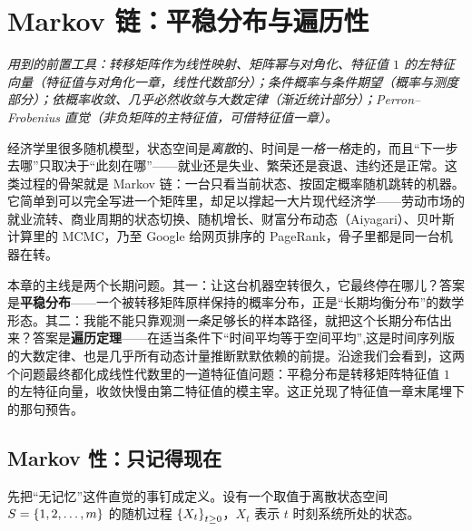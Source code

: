 \chapter{Markov 链：平稳分布与遍历性}
\label{ch:markov}

\noindent\emph{用到的前置工具：转移矩阵作为线性映射、矩阵幂与对角化、特征值 $1$ 的左特征向量（特征值与对角化一章，线性代数部分）；条件概率与条件期望（概率与测度部分）；依概率收敛、几乎必然收敛与大数定律（渐近统计部分）；Perron--Frobenius 直觉（非负矩阵的主特征值，可借特征值一章）。}
\medskip

经济学里很多随机模型，状态空间是\emph{离散}的、时间是\emph{一格一格}走的，而且``下一步去哪''只取决于``此刻在哪''——就业还是失业、繁荣还是衰退、违约还是正常。这类过程的骨架就是 Markov 链：一台只看当前状态、按固定概率随机跳转的机器。它简单到可以完全写进一个矩阵里，却足以撑起一大片现代经济学——劳动市场的就业流转、商业周期的状态切换、随机增长、财富分布动态（Aiyagari）、贝叶斯计算里的 MCMC，乃至 Google 给网页排序的 PageRank，骨子里都是同一台机器在转。

本章的主线是两个长期问题。其一：让这台机器空转很久，它最终停在哪儿？答案是\textbf{平稳分布}——一个被转移矩阵原样保持的概率分布，正是``长期均衡分布''的数学形态。其二：我能不能只靠观测\emph{一条}足够长的样本路径，就把这个长期分布估出来？答案是\textbf{遍历定理}——在适当条件下``时间平均等于空间平均'',这是时间序列版的大数定律、也是几乎所有动态计量推断默默依赖的前提。沿途我们会看到，这两个问题最终都化成线性代数里的一道特征值问题：平稳分布是转移矩阵特征值 $1$ 的左特征向量，收敛快慢由第二特征值的模主宰。这正兑现了特征值一章末尾埋下的那句预告。

\section{Markov 性：只记得现在}
\label{sec:markov-1}

先把``无记忆''这件直觉的事钉成定义。设有一个取值于离散状态空间 $S=\left\{1,2,\dots,m\right\}$ 的随机过程 $\left\{X_t\right\}_{t\ge 0}$，$X_t$ 表示 $t$ 时刻系统所处的状态。


